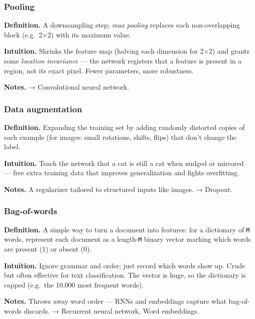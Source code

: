 \documentclass[
  10pt,
  letterpaper,
  onecolumn]{article}
\begin{document}
\hypertarget{pooling}{%
\subsubsection{Pooling}\label{pooling}}

\textbf{Definition.} A downsampling step; \emph{max pooling} replaces
each non-overlapping block (e.g.~2×2) with its maximum value.

\textbf{Intuition.} Shrinks the feature map (halving each dimension for
2×2) and grants some \emph{location invariance} --- the network
registers that a feature is present in a region, not its exact pixel.
Fewer parameters, more robustness.

\textbf{Notes.} → Convolutional neural network.

\hypertarget{data-augmentation}{%
\subsubsection{Data augmentation}\label{data-augmentation}}

\textbf{Definition.} Expanding the training set by adding randomly
distorted copies of each example (for images: small rotations, shifts,
flips) that don't change the label.

\textbf{Intuition.} Teach the network that a cat is still a cat when
nudged or mirrored --- free extra training data that improves
generalization and fights overfitting.

\textbf{Notes.} A regularizer tailored to structured inputs like images.
→ Dropout.

\hypertarget{bag-of-words}{%
\subsubsection{Bag-of-words}\label{bag-of-words}}

\textbf{Definition.} A simple way to turn a document into features: for
a dictionary of \texttt{M} words, represent each document as a
length-\texttt{M} binary vector marking which words are present (1) or
absent (0).

\textbf{Intuition.} Ignore grammar and order; just record which words
show up. Crude but often effective for text classification. The vector
is huge, so the dictionary is capped (e.g.~the 10,000 most frequent
words).

\textbf{Notes.} Throws away word order --- RNNs and embeddings capture
what bag-of-words discards. → Recurrent neural network, Word embeddings.
\end{document}
